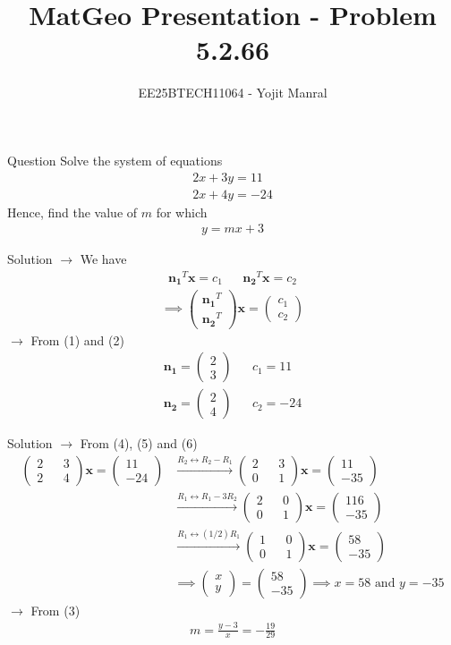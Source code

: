 \documentclass{beamer}
\title{MatGeo Presentation - Problem 5.2.66}
\author{EE25BTECH11064 - Yojit Manral}
\date{}
\numberwithin{equation}{section}
\theoremstyle{remark}
\newcommand{\myvec}[1]{\ensuremath{\begin{pmatrix}#1\end{pmatrix}}}
\let\vec\mathbf
\begin{document}
\frame{\titlepage}
\begin{frame}{Question}
Solve the system of equations
\begin{align}
    2x + 3y = 11 \\
    2x + 4y = -24
\end{align}
Hence, find the value of $m$ for which
\begin{align}
    y = mx + 3
\end{align}
\end{frame}

\begin{frame}{Solution}
$\rightarrow$ We have
\begin{align*} \vec{n_1}^T\vec{x} = c_1 && \vec{n_2}^T\vec{x} = c_2 \end{align*}
\begin{align} \implies \myvec{\vec{n_1}^T\\\vec{n_2}^T}\vec{x} = \myvec{c_1\\c_2} \end{align}
$\rightarrow$ From (1) and (2)
\begin{align}
    \vec{n_1} = \myvec{2\\3} && c_1 = 11 \\
    \vec{n_2} = \myvec{2\\4} && c_2 = -24
\end{align}
\end{frame}

\begin{frame}{Solution}
$\rightarrow$ From (4), (5) and (6)
\begin{align}
    \myvec{2&&3\\2&&4}\vec{x} = \myvec{11\\-24}
    &\xrightarrow{R_2 \leftrightarrow R_2 - R_1} \myvec{2&&3\\0&&1}\vec{x} = \myvec{11\\-35} \\
    &\xrightarrow{R_1 \leftrightarrow R_1 - 3R_2}\myvec{2&&0\\0&&1}\vec{x} = \myvec{116\\-35} \\
    &\xrightarrow{R_1 \leftrightarrow (1/2)R_1} \myvec{1&&0\\0&&1}\vec{x} = \myvec{58\\-35} \\
    &\implies \myvec{x\\y} = \myvec{58\\-35} \implies x = 58 \text{ and } y = -35
\end{align}
$\rightarrow$ From (3)
\begin{align}
    m = \frac{y - 3}{x} = -\frac{19}{29}
\end{align}
\end{frame}
\end{document}
